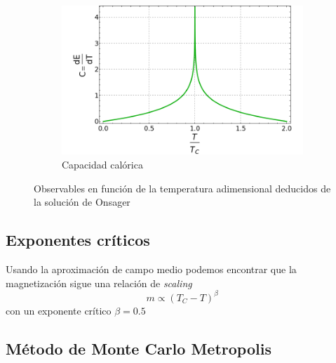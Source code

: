\documentclass[12pt,a4paper]{article}
\begin{document}
\begin{figure}[H]
\begin{subfigure}[c]{0.45\textwidth}
\centering
\includegraphics[width=\textwidth]{teoricos/c_onsager.png}
\caption{Capacidad calórica}
\label{fig:c_onsager}
\end{subfigure}
\caption{Observables en función de la temperatura adimensional deducidos de la solución de Onsager}
\label{fig:onsager}
\end{figure}


\subsection{Exponentes críticos}
Usando la aproximación de campo medio podemos encontrar que la magnetización sigue una relación de \emph{scaling}
\begin{equation}
 m \propto (T_C - T)^{\beta}
 \label{eq:exp_critico}
\end{equation}
con un exponente crítico $\beta = 0.5$

\subsection{Método de Monte Carlo Metropolis}
\end{document}
